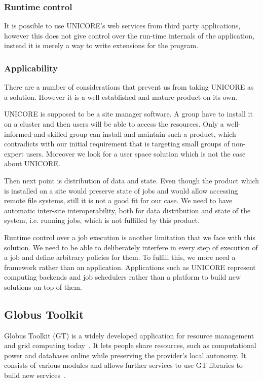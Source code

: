 \subsubsection {Runtime control}
It is possible to use UNICORE's web services from third party applications, however this does 
not give control over the run-time internals of the application, instead it is merely a way 
to write extensions for the program.
\subsubsection {Applicability}
There are a number of considerations that prevent us from taking UNICORE as a solution. However
it is a well established and mature product on its own.

UNICORE is supposed to be a site manager software. A group have to install it on a cluster and
then users will be able to access the resources. Only a well-informed and skilled group can 
install and maintain such a product, which contradicts with our initial requirement that is 
targeting small groups of non-expert users. Moreover we look for a user space solution which is not the case
about UNICORE.

Then next point is distribution of data and state. Even though the product which is installed
on a site would preserve state of jobs and would allow accessing remote file systems, still it is
not a good fit for our case. We need to have automatic inter-site interoperability, both for
data distribution and state of the system, i.e. running jobs, which is not fulfilled by this
product.

Runtime control over a job execution is another limitation that we face with this solution.
We need to be able to deliberately interfere in every step of execution of a job and define 
arbitrary policies for them. To fulfill this, we more need a framework rather than an application.
Applications such as UNICORE represent computing backends and job schedulers rather than a 
platform to build new solutions on top of them.

\subsection{Globus Toolkit}
Globus Toolkit (GT) is a widely developed application for resource management and grid computing today~\cite{eickermann2005steering}.
It lets people share resources, such as computational power and databases online while preserving the
provider's local autonomy. It consists of various modules and allows further services
to use GT libraries to build new services~\cite{foster2005network}.

